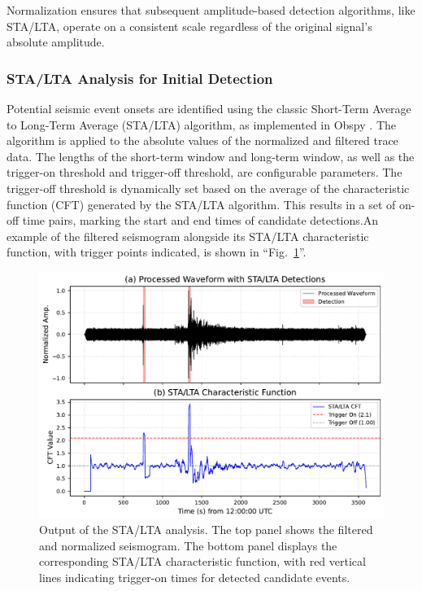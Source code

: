 \documentclass[conference]{IEEEtran}
\begin{document}
            Normalization ensures that subsequent amplitude-based detection algorithms, like STA/LTA, operate on a
            consistent scale regardless of the original signal's absolute amplitude.
                
        \subsubsection{STA\slash LTA Analysis for Initial Detection}
            Potential seismic event onsets are identified using the classic Short-Term Average to Long-Term Average
            (STA/LTA) algorithm, as implemented in Obspy \cite{Beyreuther2010}. The algorithm is applied to the absolute
            values of the normalized and filtered trace data. The lengths of the short-term window and long-term window,
            as well as the trigger-on threshold and trigger-off threshold, are configurable parameters. The trigger-off
            threshold is dynamically set based on the average of the characteristic function (CFT) generated by the
            STA/LTA algorithm. This results in a set of on-off time pairs, marking the start and end times of candidate
            detections.An example of the filtered seismogram alongside its STA/LTA characteristic function, with trigger
            points indicated, is shown in ``Fig.~\ref{fig:stalta_output}''.
            \begin{figure}[htbp]
                \centerline{\includegraphics[width=0.9\columnwidth]{figures/fig4_stalta_detections.pdf}}
                \caption{Output of the STA/LTA analysis. The top panel shows the filtered and normalized seismogram. 
                The bottom panel displays the corresponding STA/LTA characteristic function, with red vertical 
                lines indicating trigger-on times for detected candidate events.}
                \label{fig:stalta_output}
            \end{figure}
\end{document}
